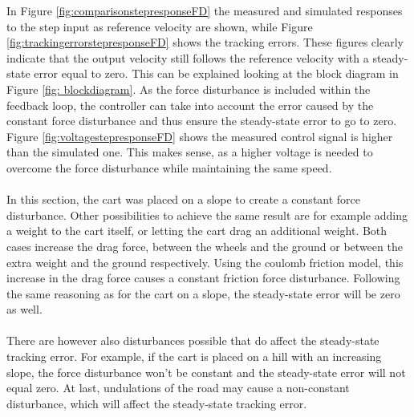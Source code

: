 \documentclass[a4paper,kul]{kulakarticle} %
\begin{document}
\noindent In Figure \ref{fig:comparisonstepresponseFD} the measured and simulated responses to the step input as reference velocity are shown, while Figure \ref{fig:trackingerrorstepresponseFD} shows the tracking errors. These figures clearly indicate that the output velocity still follows the reference velocity with a steady-state error equal to zero. This can be explained looking at the block diagram in Figure \ref{fig: blockdiagram}. As the force disturbance is included within the feedback loop, the controller can take into account the error caused by the constant force disturbance and thus ensure the steady-state error to go to zero. Figure \ref{fig:voltagestepresponseFD} shows the measured control signal is higher than the simulated one. This makes sense, as a higher voltage is needed to overcome the force disturbance while maintaining the same speed. 
\\\\
In this section, the cart was placed on a slope to create a constant force disturbance. Other possibilities to achieve the same result are for example adding a weight to the cart itself, or letting the cart drag an additional weight. Both cases increase the drag force, between the wheels and the ground or between the extra weight and the ground respectively. Using the coulomb friction model, this increase in the drag force causes a constant friction force disturbance. Following the same reasoning as for the cart on a slope, the steady-state error will be zero as well. 
\\\\
There are however also disturbances possible that do affect the steady-state tracking error. For example, if the cart is placed on a hill with an increasing slope, the force disturbance won't be constant and the steady-state error will not equal zero. At last, undulations of the road may cause a non-constant disturbance, which will affect the steady-state tracking error. 
\end{document}

